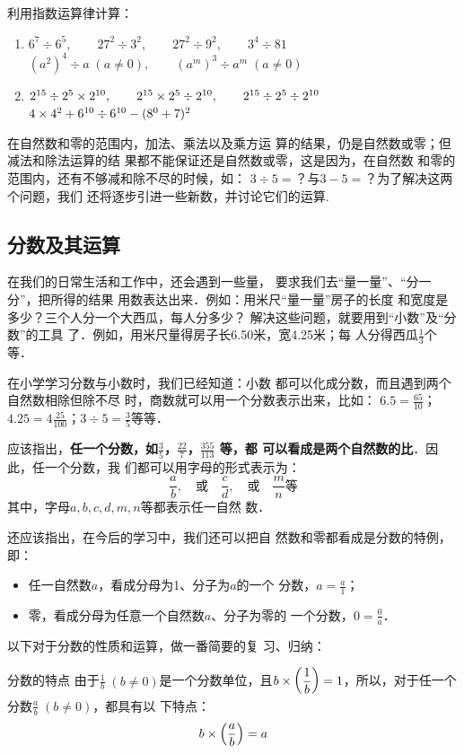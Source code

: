 \begin{ex}
利用指数运算律计算：
\begin{enumerate}
    \item $6^7\div 6^5,\qquad 27^2\div 3^2,\qquad 27^2\div 9^2,\qquad 3^4\div 81$
    $(a^2)^4\div a\; (a\ne 0),\qquad (a^m)^3\div a^m\; (a\ne 0)$
    \item $2^{15}\div 2^5\times 2^{10},\qquad 2^{15}\times 2^5\div 2^{10},\qquad 2^{15}\div 2^5\div 2^{10}$
    $4\times 4^2 +6^{10}\div 6^{10}-(8^0+7)^2$
\end{enumerate}
\end{ex}

在自然数和零的范围内，加法、乘法以及乘方运
算的结果，仍是自然数或零；但减法和除法运算的结
果都不能保证还是自然数或零，这是因为，在自然数
和零的范围内，还有不够减和除不尽的时候，如：
$3\div 5=$？与$3-5=$？为了解决这两个问题，我们
还将逐步引进一些新数，并讨论它们的运算.

\subsection{分数及其运算}

在我们的日常生活和工作中，还会遇到一些量，
要求我们去“量一量”、“分一分”，把所得的结果
用数表达出来．例如：用米尺“量一量”房子的长度
和宽度是多少？三个人分一个大西瓜，每人分多少？
解决这些问题，就要用到“小数”及“分数”的工具
了．例如，用米尺量得房子长6.50米，宽4.25米；每
人分得西瓜$\frac{1}{3}$个等．

在小学学习分数与小数时，我们已经知道：小数
都可以化成分数，而且遇到两个自然数相除但除不尽
时，商数就可以用一个分数表示出来，比如：
$6.5=\frac{65}{10}$；$4.25=4\frac{25}{100}$；$3\div 5=\frac{3}{5}$等等．

应该指出，\textbf{任一个分数，如$\frac{3}{5}$，$\frac{22}{7}$，$\frac{355}{113}$
等，都
可以看成是两个自然数的比}．因此，任一个分数，我
们都可以用字母的形式表示为：
\[\frac{a}{b},\quad \text{或}\quad \frac{c}{d}, \quad \text{或} \quad \frac{m}{n} \text{等} \]
其中，字母$a, b, c, d, m,n$等都表示任一自然
数．

    还应该指出，在今后的学习中，我们还可以把自
然数和零都看成是分数的特例，即：
\begin{itemize}
    \item 任一自然数$a$，看成分母为1、分子为$a$的一个
    分数，$a=\frac{a}{1}$；
    \item 零，看成分母为任意一个自然数$a$、分子为零的
    一个分数，$0=\frac{0}{a}$．
\end{itemize}

以下对于分数的性质和运算，做一番简要的复
习、归纳：
\begin{blk}{分数的特点}
    由于$\frac{1}{b}\; (b\ne 0)$是一个分数单位，且$b\times\left(\dfrac{1}{b}\right)=1$，所以，对于任一个分数$\frac{a}{b}\; (b\ne 0)$，都具有以
    下特点：
    \[b\times\left(\dfrac{a}{b}\right)=a \]
\end{blk}

